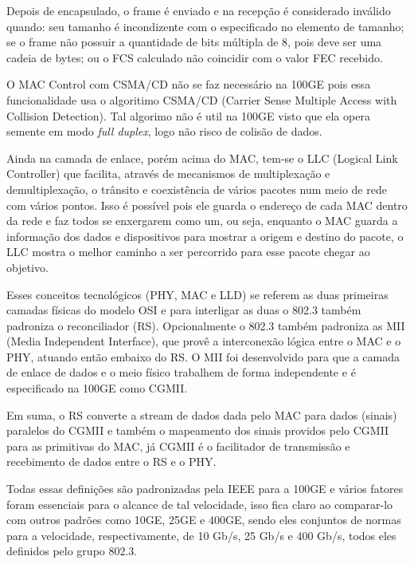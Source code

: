 \documentclass[a4paper,12pt]{article}
\begin{document}
Depois de encapsulado, o frame é enviado e na recepção é considerado inválido quando: seu tamanho é incondizente com o especificado no elemento de tamanho; se o frame não possuir a quantidade de bits múltipla de 8, pois deve ser uma cadeia de bytes; ou o FCS calculado não coincidir com o valor FEC recebido.

O MAC Control com CSMA/CD não se faz necessário na 100GE pois essa funcionalidade usa o algoritimo CSMA/CD (Carrier Sense Multiple Access with Collision Detection). Tal algorimo não é util na 100GE visto que ela opera semente em modo \textit{full duplex}, logo não risco de colisão de dados.

Ainda na camada de enlace, porém acima do MAC, tem-se o LLC (Logical Link Controller) que facilita, através de mecanismos de multiplexação e demultiplexação, o trânsito e coexistência de vários pacotes num meio de rede com vários pontos. Isso é possível pois ele guarda o endereço de cada MAC dentro da rede e faz todos se enxergarem como um, ou seja, enquanto o MAC guarda a informação dos dados e dispositivos para mostrar a origem e destino do pacote, o LLC mostra o melhor caminho a ser percorrido para esse pacote chegar ao objetivo.

Esses conceitos tecnológicos (PHY, MAC e LLD) se referem as duas primeiras camadas físicas do modelo OSI e para interligar as duas o 802.3 também padroniza o reconciliador (RS). Opcionalmente o 802.3 também padroniza as MII (Media Independent Interface), que provê a interconexão lógica entre o MAC e o PHY, atuando então embaixo do RS. O MII foi desenvolvido para que a camada de enlace de dados e o meio físico trabalhem de forma independente e é especificado na 100GE como CGMII.

Em suma, o RS converte a stream de dados dada pelo MAC para dados (sinais) paralelos do CGMII e também o mapeamento dos sinais providos pelo CGMII para as primitivas do MAC, já CGMII é o facilitador de transmissão e recebimento de dados entre o RS e o PHY.

Todas essas definições são padronizadas pela IEEE para a 100GE e vários fatores foram essenciais para o alcance de tal velocidade, isso fica claro ao comparar-lo com outros padrões como 10GE, 25GE e 400GE, sendo eles conjuntos de normas para a velocidade, respectivamente, de 10 Gb/s, 25 Gb/s e 400 Gb/s,  todos eles definidos pelo grupo 802.3.
\end{document}
